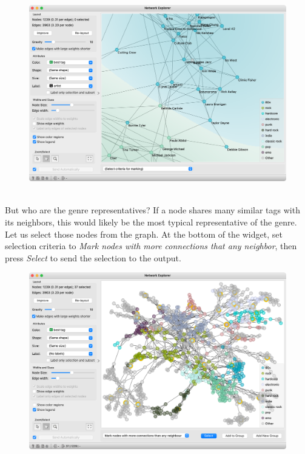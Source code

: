 \vspace{-0.2cm}
\begin{figure}[h]
  \centering
  \includegraphics[width=\linewidth]{network-zoom.png}%
  \caption{$\;$}
\end{figure}
\vspace{-0.3cm}

\newpage

But who are the genre representatives? If a node shares many similar tags with its neighbors, this would likely be the most typical representative of the genre. Let us select those nodes from the graph. At the bottom of the widget, set selection criteria to \emph{Mark nodes with more connections that any neighbor}, then press \emph{Select} to send the selection to the output.

\vspace{-0.2cm}
\begin{figure}[h]
  \centering
  \includegraphics[width=\linewidth]{network-selection.png}%
  \caption{$\;$}
\end{figure}
\vspace{-0.3cm}

